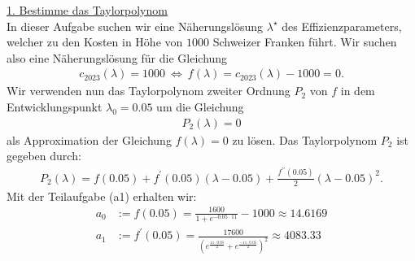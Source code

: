 \underline{1. Bestimme das Taylorpolynom}\\
In dieser Aufgabe suchen wir eine Näherungslösung $\lambda^\star$ des Effizienzparameters, welcher zu den Kosten in Höhe von $1000$ Schweizer Franken führt. Wir suchen also eine Näherungslösung für die Gleichung
\begin{align*}
	c_{2023}(\lambda) = 1000
	\ \Leftrightarrow \
	f(\lambda) = c_{2023}(\lambda ) - 1000 = 0.
\end{align*}
Wir verwenden nun das Taylorpolynom zweiter Ordnung $P_2$ von $f$ in dem Entwicklungspunkt $\lambda_0 = 0.05$ um die Gleichung
\begin{align*}
	P_2(\lambda) = 0
\end{align*}
als Approximation der Gleichung $f(\lambda) = 0$ zu lösen. Das Taylorpolynom $P_2$ ist gegeben durch:
\begin{align*}
	P_2(\lambda)
	=
	f(0.05) 
	+ f^\prime(0.05) (\lambda - 0.05)
	+ \frac{f^{\prime \prime}(0.05)}{2} (\lambda - 0.05)^2.
\end{align*}
Mit der Teilaufgabe (a1)  erhalten wir:
\begin{align*}
	a_0 &:= f(0.05) 
	= 
	\frac{1600}{1 + e^{- 0.05\cdot 11}} - 1000
	\approx  14.6169\\
	a_1 &:= f^\prime(0.05)
	=
	\frac{17600}{\left( e^{\frac{11 \cdot 0.05}{2}} + e^{\frac{-11 \cdot 0.05}{2}} \right)^2}
	\approx 4083.33
\end{align*}

\newpage
